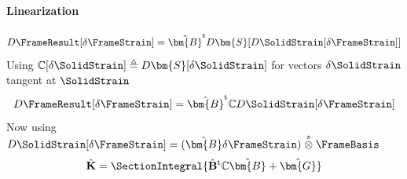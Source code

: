 \paragraph{Linearization}
\begin{equation*}
    D {\FrameResult} [\delta \FrameStrain] = \hat{\bm{B}}^{\mathrm{t}}D \bm{S} [D \SolidStrain [\delta \FrameStrain]]
\end{equation*}
Using \(\mathbb{C}[\delta \SolidStrain] \triangleq D\bm{S}[\delta \SolidStrain]\) for vectors \(\delta \SolidStrain\) tangent at \(\SolidStrain\) 
\begin{equation*}
 D {\FrameResult} [\delta \FrameStrain] = \hat{\bm{B}}^{\mathrm{t}} \mathbb{C} D \SolidStrain [\delta \FrameStrain]
\end{equation*}
Now using \(D \SolidStrain [\delta \FrameStrain] = (\hat{\bm{B}}\delta \FrameStrain) \stackrel{s}{\otimes} \FrameBasis\)
\begin{equation}
\hat{\mathbf{K}} = \SectionIntegral{
    \hat{\mathbf{B}}^{\mathrm{t}} \mathbb{C}\hat{\bm{B}} + \hat{\bm{G}}
    }
\label{eq:section-tangent}
\end{equation}

